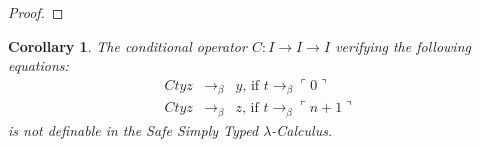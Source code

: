 \documentclass{article}
\newtheorem{corollary}[theorem]{Corollary}
\newcommand{\encode}[1]{\ulcorner #1 \urcorner}
\newcommand{\nat}{\mathbb{N}}
\begin{document}
\begin{proof}
%
%
%
%
%
%
%
%
%
%
%
\end{proof}

\begin{corollary}
The conditional operator $C:I\rightarrow I\rightarrow I$ verifying the following equations:
\begin{eqnarray*}
C t y z &\rightarrow_\beta& y \mbox{, if } t \rightarrow_\beta \encode{0} \\
C t y z &\rightarrow_\beta& z \mbox{, if } t \rightarrow_\beta \encode{n+1}
\end{eqnarray*}
is not definable in the Safe Simply Typed $\lambda$-Calculus.
\end{corollary}





\end{document}
